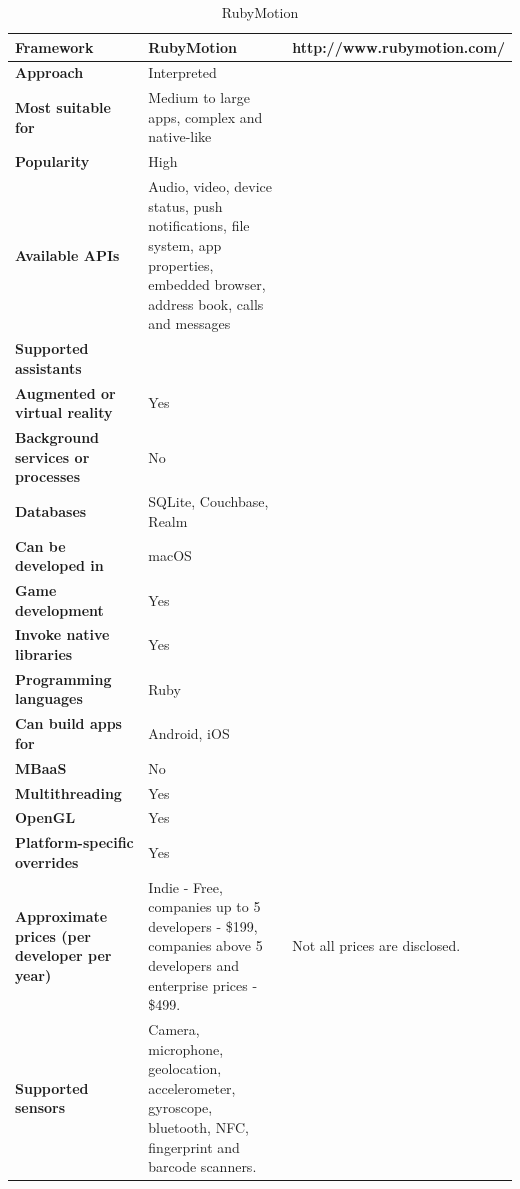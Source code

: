 \documentclass[english,master,public,dept460,male,cpdeclaration,oneside]{diploma}
\begin{document}
\begin{table}[!h]
	\centering
	\caption{RubyMotion}
	\begin{tabular}{p{} | p{} | p{}}
		\toprule		
		\textbf{Framework} & \textbf{RubyMotion} & http://www.rubymotion.com/ \\
		\midrule
		\textbf{Approach} & Interpreted & \\			
		\midrule	
		\textbf{Most suitable for} & Medium to large apps, complex and native-like & \\
		\midrule
		\textbf{Popularity} & High & \\			
		\midrule
		\textbf{Available APIs} & Audio, video, device status, push notifications, file system, app properties, embedded browser, address book, calls and messages & \\			
		\midrule
		\textbf{Supported assistants} & & \\			
		\midrule
		\textbf{Augmented or virtual reality} & Yes & \\			
		\midrule
		\textbf{Background services or processes} & No & \\			
		\midrule
		\textbf{Databases} & SQLite, Couchbase, Realm & \\			
		\midrule
		\textbf{Can be developed in} & macOS &  \\			
		\midrule
		\textbf{Game development} & Yes & \\			
		\midrule
		\textbf{Invoke native libraries} & Yes & \\			
		\midrule
		\textbf{Programming languages} & Ruby & \\			
		\midrule
		\textbf{Can build apps for} & Android, iOS & \\			
		\midrule
		\textbf{MBaaS} & No & \\			
		\midrule
		\textbf{Multithreading} & Yes & \\			
		\midrule
		\textbf{OpenGL} & Yes & \\			
		\midrule
		\textbf{Platform-specific overrides} & Yes & \\			
		\midrule
		\textbf{Approximate prices (per developer per year)} & Indie - Free, companies up to 5 developers - \$199, companies above 5 developers and enterprise prices - \$499. & Not all prices are disclosed. \\			
		\midrule
		\textbf{Supported sensors} & Camera, microphone, geolocation, accelerometer, gyroscope, bluetooth, NFC, fingerprint and barcode scanners. & \\			
		\midrule
	\end{tabular}
\end{table}
\end{document}
